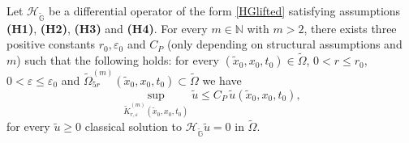 \documentclass[10pt,a4paper]{amsart}
\def \GG {{\mathbb{G}}}
\def \HG {\mathscr{H}_{\tilde\GG}}
\newcommand{\N}{\mathbb{N}}
\def \O {{\Omega}}
\def \e {{\varepsilon}}
\def \tt {\tilde}
\begin{document}
\begin{proposition}\label{lifted-harnack}
	Let $\HG$ be a differential operator of the form \eqref{HGlifted} satisfying assumptions \textbf{(H1)}, \textbf{(H2)}, \textbf{(H3)} and \textbf{(H4)}. For every $m\in\N$ with $m>2$, there exists three positive constants $r_0,\e_0$ and $C_P$ (only depending on structural assumptions and $m$) such that the following holds: for every $(\tt x_0,x_0, t_0)\in\tt\O$, $0<r\leq r_0$, $0<\e\leq \e_0$ and $\tt\O^{(m)}_{5r}(\tt x_0, x_0, t_0)\subset \tt\O$ we have
	\begin{equation}\label{parabolic-Harnack-lifted}
		\sup_{\tt K_{r,\e}^{(m)}(\tt x_0, x_0, t_0)} \tt u \leq C_P \, \tt u(\tt x_0, x_0, t_0),
	\end{equation}
	for every $\tt u\geq0$ classical solution to $\HG \tt u =0$ in $\tt\O$.
\end{proposition}
\end{document}
